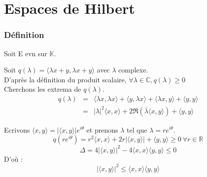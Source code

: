 \part{Espaces de Hilbert}
\section{Définition}
Soit E evn sur $\mathbb{K}$.


\begin{dem}
	Soit $q(\lambda)=\langle \lambda x+y, \lambda x+y\rangle$ avec $\lambda$ complexe.\\
	D'après la définition du produit scalaire, $\forall \lambda\in\mathbb{C}, q(\lambda)\geq 0$\\
	Cherchons les extrema de $q(\lambda)$. 
	\begin{eqnarray*}
		q(\lambda)&=&\langle\lambda x, \lambda x\rangle + \langle y, \lambda x\rangle + \langle \lambda x,y\rangle + \langle y,y\rangle \\
			  &=&|\lambda|^2\langle x,x\rangle + 2\Re(\bar{\lambda}\langle x,y\rangle) + \langle y,y \rangle
	\end{eqnarray*}

	Ecrivons $\langle x,y\rangle=|\langle x,y\rangle| e^{i\theta}$ et prenons $\lambda$ tel que $\lambda=re^{i\theta}$.
	\[q(re^{i\theta})=r^2\langle x,x\rangle+2r|\langle x,y\rangle|+\langle y,y\rangle\geq 0\ \forall r\in\mathbb{R}\]
	\[\Delta=4|\langle x,y\rangle|^2-4\langle x,x\rangle\langle y,y\rangle\leq 0\]
	D'où :
	\[|\langle x,y\rangle|^2\leq\langle x,x\rangle\langle y,y\rangle\]
\end{dem}

